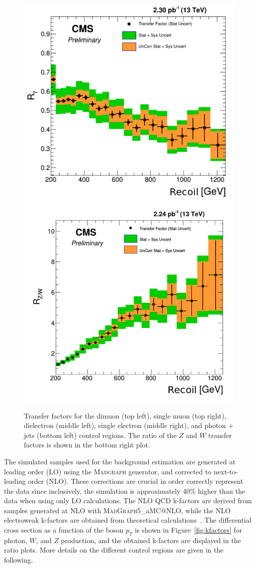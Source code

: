 \begin{figure}[p]
 \vspace{.2cm}
 \includegraphics[width=.49\textwidth]{gamma_TF.png} 
 \includegraphics[width=.5\textwidth]{ZW_ratio.png} 
 \caption{Transfer factors for the dimuon (top left), single muon (top right), dielectron (middle left), single electron (middle right), and photon + jets (bottom left) control regions. The ratio of the $Z$ and $W$ transfer factors is shown in the bottom right plot.}
 \label{fig:TF}
\end{figure}

The simulated samples used for the background estimation are generated at leading order (LO) using the \textsc{Madgraph} generator, and corrected to next-to-leading order (NLO). These corrections are crucial in order correctly represent the data since inclusively, the simulation is approximately 40\% higher than the data when using only LO calculations. The NLO QCD k-factors are derived from samples generated at NLO with \textsc{MadGraph5\_}a\textsc{MC@NLO}, while the \ac{NLO} electroweak k-factors are obtained from theoretical calculations~\cite{Kuhn:2005gv, Kallweit:2015fta, Kallweit:2014xda, Kallweit:2015dum}. The differential cross section as a function of the boson $p_T$ is shown in Figure~\ref{fig:kfactors} for photon, $W$, and $Z$ production, and the obtained k-factors are displayed in the ratio plots. More details on the different control regions are given in the following.

